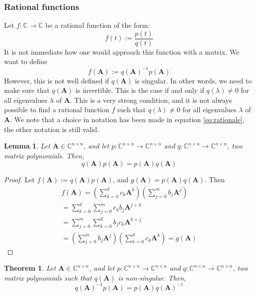 \documentclass[11pt]{article}
\newtheorem{lemma}{Lemma}
\newtheorem{theorem}{Theorem}
\numberwithin{equation}{section}
\begin{document}
\subsubsection*{Rational functions}
Let $f:\mathbb{C}\rightarrow\mathbb{C}$ be a rational function of the form:
\begin{equation}
    f(t) := \frac{p(t)}{q(t)}
\end{equation}
It is not immediate how one would approach this function with a matrix. We want to define
\begin{equation}\label{eq:rationale}
    f(\mathbf{A}) := q(\mathbf{A})^{-1}p(\mathbf{A})
\end{equation}
However, this is not well defined if $q(\mathbf{A})$ is singular. In other words, we need to make sure that $q(\mathbf{A})$ is invertible. This is the case if and only if $q(\lambda) \neq 0$ for all eigenvalues $\lambda$ of $\mathbf{A}$. This is a very strong condition, and it is not always possible to find a rational function $f$ such that $q(\lambda) \neq 0$ for all eigenvalues $\lambda$ of $\mathbf{A}$. We note that a choice in notation has been made in equation \ref{eq:rationale}, the other notation is still valid.
\begin{lemma}\label{lem:commute}
     Let $\mathbf{A}\in\mathbb{C}^{n\times n}$, and let $p:\mathbb{C}^{n\times n}\rightarrow\mathbb{C}^{n\times n}$ and $q:\mathbb{C}^{n\times n}\rightarrow\mathbb{C}^{n\times n}$, two matrix polynomials. Then,
     \begin{equation}
         q(\mathbf{A})p(\mathbf{A}) = p(\mathbf{A})q(\mathbf{A})
     \end{equation}
\end{lemma}
\begin{proof}
    Let $f(\mathbf{A}) := q(\mathbf{A})p(\mathbf{A})$, and $g(\mathbf{A}) = p(\mathbf{A})q(\mathbf{A})$. Then
    \begin{align*}
        f(\mathbf{A}) = \left(\sum_{k=0}^d c_k\mathbf{A}^k\right)\left(\sum_{j=0}^m b_j\mathbf{A}^j\right)\\
        = \sum_{k=0}^d \sum_{j=0}^m c_kb_j\mathbf{A}^{j+k}\\
        = \sum_{j=0}^m \sum_{k=0}^d b_jc_k\mathbf{A}^{k+j}\\
        = \left(\sum_{j=0}^m b_j\mathbf{A}^j\right)\left(\sum_{k=0}^d c_k\mathbf{A}^k\right) = g(\mathbf{A})
    \end{align*}
\end{proof}
\begin{theorem}
    Let $\mathbf{A}\in\mathbb{C}^{n\times n}$, and let $p:\mathbb{C}^{n\times n}\rightarrow\mathbb{C}^{n\times n}$ and $q:\mathbb{C}^{n\times n}\rightarrow\mathbb{C}^{n\times n}$, two matrix polynomials such that $q(\mathbf{A})$ is non-singular. Then, 
    \begin{equation}
        q(\mathbf{A})^{-1}p(\mathbf{A}) = p(\mathbf{A})q(\mathbf{A})^{-1}
    \end{equation}
\end{theorem}
\end{document}
